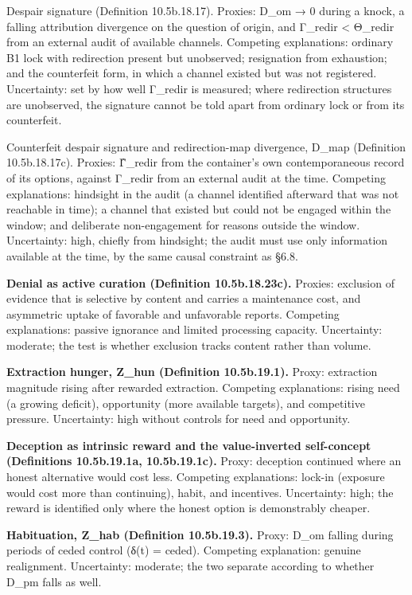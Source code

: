 \documentclass[
]{article}
\begin{document}
Despair signature (Definition 10.5b.18.17). Proxies: D\_om → 0 during a
knock, a falling attribution divergence on the question of origin, and
Γ\_redir \textless{} Θ\_redir from an external audit of available
channels. Competing explanations: ordinary B1 lock with redirection
present but unobserved; resignation from exhaustion; and the counterfeit
form, in which a channel existed but was not registered. Uncertainty:
set by how well Γ\_redir is measured; where redirection structures are
unobserved, the signature cannot be told apart from ordinary lock or
from its counterfeit.

Counterfeit despair signature and redirection-map divergence, D\_map
(Definition 10.5b.18.17c). Proxies: Γ̂\_redir from the container's own
contemporaneous record of its options, against Γ\_redir from an external
audit at the time. Competing explanations: hindsight in the audit (a
channel identified afterward that was not reachable in time); a channel
that existed but could not be engaged within the window; and deliberate
non-engagement for reasons outside the window. Uncertainty: high,
chiefly from hindsight; the audit must use only information available at
the time, by the same causal constraint as §6.8.

\textbf{Denial as active curation (Definition 10.5b.18.23c).} Proxies:
exclusion of evidence that is selective by content and carries a
maintenance cost, and asymmetric uptake of favorable and unfavorable
reports. Competing explanations: passive ignorance and limited
processing capacity. Uncertainty: moderate; the test is whether
exclusion tracks content rather than volume.

\textbf{Extraction hunger, Z\_hun (Definition 10.5b.19.1).} Proxy:
extraction magnitude rising after rewarded extraction. Competing
explanations: rising need (a growing deficit), opportunity (more
available targets), and competitive pressure. Uncertainty: high without
controls for need and opportunity.

\textbf{Deception as intrinsic reward and the value-inverted
self-concept (Definitions 10.5b.19.1a, 10.5b.19.1c).} Proxy: deception
continued where an honest alternative would cost less. Competing
explanations: lock-in (exposure would cost more than continuing), habit,
and incentives. Uncertainty: high; the reward is identified only where
the honest option is demonstrably cheaper.

\textbf{Habituation, Z\_hab (Definition 10.5b.19.3).} Proxy: D\_om
falling during periods of ceded control (δ(t) = ceded). Competing
explanation: genuine realignment. Uncertainty: moderate; the two
separate according to whether D\_pm falls as well.
\end{document}
